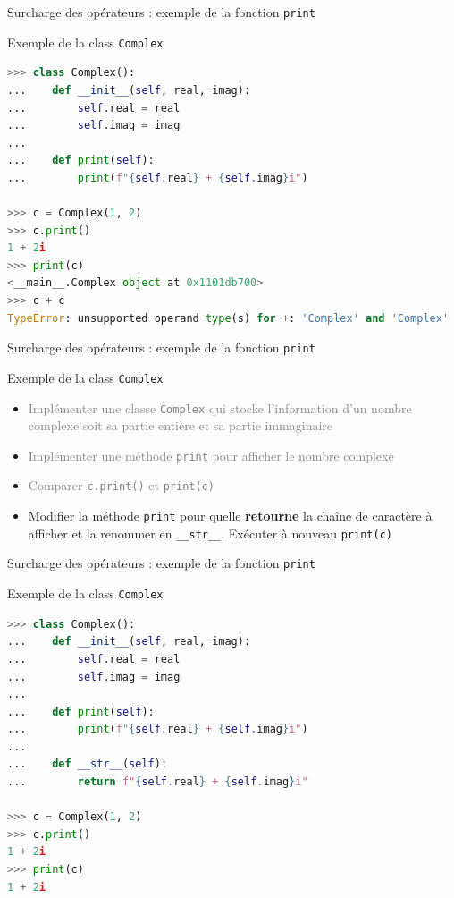 \documentclass[10pt]{beamer}
\begin{document}
\begin{frame}[fragile]{Surcharge des opérateurs : exemple de la fonction \texttt{print}}
  \begin{block}{Exemple de la class \texttt{Complex}}
    \medskip
\begin{lstlisting}[language=python, numbers=none]
>>> class Complex():
...    def __init__(self, real, imag):
...        self.real = real
...        self.imag = imag
...
...    def print(self):
...        print(f"{self.real} + {self.imag}i")

>>> c = Complex(1, 2)
>>> c.print()
1 + 2i
>>> print(c)
<__main__.Complex object at 0x1101db700>
>>> c + c
TypeError: unsupported operand type(s) for +: 'Complex' and 'Complex'
\end{lstlisting}
\end{block}
\end{frame}


\begin{frame}[fragile]{Surcharge des opérateurs : exemple de la fonction \texttt{print}}

  \begin{block}{Exemple de la class \texttt{Complex}}
    \medskip
    \begin{itemize}
      \item \textcolor{gray}{Implémenter une classe \texttt{Complex} qui stocke l'information d'un nombre complexe soit sa partie entière et sa partie immaginaire}
      \item \textcolor{gray}{Implémenter une méthode \texttt{print} pour afficher le nombre complexe}
      \item \textcolor{gray}{Comparer \texttt{c.print()} et \texttt{print(c)}}
      \item Modifier la méthode \texttt{print} pour quelle \textbf{retourne} la chaîne de caractère à afficher et la renommer en \texttt{\_\_str\_\_}. Exécuter à nouveau \texttt{print(c)}
    \end{itemize}
  \end{block}
\end{frame}


\begin{frame}[fragile]{Surcharge des opérateurs : exemple de la fonction \texttt{print}}
  \begin{block}{Exemple de la class \texttt{Complex}}
    \medskip
\begin{lstlisting}[language=python, numbers=none]
>>> class Complex():
...    def __init__(self, real, imag):
...        self.real = real
...        self.imag = imag
...
...    def print(self):
...        print(f"{self.real} + {self.imag}i")
...
...    def __str__(self):
...        return f"{self.real} + {self.imag}i"

>>> c = Complex(1, 2)
>>> c.print()
1 + 2i
>>> print(c)
1 + 2i
\end{lstlisting}
\end{block}
\end{frame}
\end{document}

